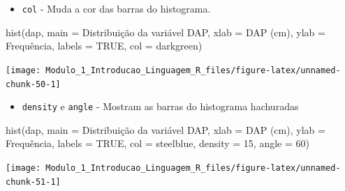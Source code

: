 \documentclass[
]{article}
\newenvironment{Shaded}{\begin{snugshade}}{\end{snugshade}}
\newcommand{\AttributeTok}[1]{\textcolor[rgb]{0.77,0.63,0.00}{#1}}
\newcommand{\ConstantTok}[1]{\textcolor[rgb]{0.00,0.00,0.00}{#1}}
\newcommand{\DecValTok}[1]{\textcolor[rgb]{0.00,0.00,0.81}{#1}}
\newcommand{\FunctionTok}[1]{\textcolor[rgb]{0.00,0.00,0.00}{#1}}
\newcommand{\NormalTok}[1]{#1}
\newcommand{\StringTok}[1]{\textcolor[rgb]{0.31,0.60,0.02}{#1}}
\providecommand{\tightlist}{%
  \setlength{\itemsep}{0pt}\setlength{\parskip}{0pt}}
\begin{document}
\begin{itemize}
\tightlist
\item
  \texttt{col} - Muda a cor das barras do histograma.
\end{itemize}

\begin{Shaded}
\begin{Highlighting}[]
\FunctionTok{hist}\NormalTok{(dap, }
     \AttributeTok{main =} \StringTok{\textquotesingle{}Distribuição da variável DAP\textquotesingle{}}\NormalTok{,}
    \AttributeTok{xlab =} \StringTok{\textquotesingle{}DAP (cm)\textquotesingle{}}\NormalTok{,}
    \AttributeTok{ylab =} \StringTok{\textquotesingle{}Frequência\textquotesingle{}}\NormalTok{,}
    \AttributeTok{labels =} \ConstantTok{TRUE}\NormalTok{,}
    \AttributeTok{col =} \StringTok{\textquotesingle{}darkgreen\textquotesingle{}}\NormalTok{)}
\end{Highlighting}
\end{Shaded}

\begin{center}\texttt{[image: Modulo\_1\_Introducao\_Linguagem\_R\_files/figure-latex/unnamed-chunk-50-1]} \end{center}

\begin{itemize}
\tightlist
\item
  \texttt{density} e \texttt{angle} - Mostram as barras do histograma
  hachuradas
\end{itemize}

\begin{Shaded}
\begin{Highlighting}[]
\FunctionTok{hist}\NormalTok{(dap, }
     \AttributeTok{main =} \StringTok{\textquotesingle{}Distribuição da variável DAP\textquotesingle{}}\NormalTok{,}
    \AttributeTok{xlab =} \StringTok{\textquotesingle{}DAP (cm)\textquotesingle{}}\NormalTok{,}
    \AttributeTok{ylab =} \StringTok{\textquotesingle{}Frequência\textquotesingle{}}\NormalTok{,}
    \AttributeTok{labels =} \ConstantTok{TRUE}\NormalTok{,}
    \AttributeTok{col =} \StringTok{\textquotesingle{}steelblue\textquotesingle{}}\NormalTok{,}
    \AttributeTok{density =} \DecValTok{15}\NormalTok{,}
    \AttributeTok{angle =} \DecValTok{60}\NormalTok{)}
\end{Highlighting}
\end{Shaded}

\begin{center}\texttt{[image: Modulo\_1\_Introducao\_Linguagem\_R\_files/figure-latex/unnamed-chunk-51-1]} \end{center}
\end{document}
